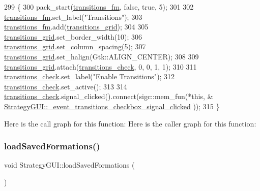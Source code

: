 \begin{DoxyCode}
299                                          \{
300     pack\_start(\hyperlink{class_strategy_g_u_i_ab3d47a7a0fb8e1f7e030c4daad0ca8ec}{transitions\_fm}, \textcolor{keyword}{false}, \textcolor{keyword}{true}, 5);
301 
302     \hyperlink{class_strategy_g_u_i_ab3d47a7a0fb8e1f7e030c4daad0ca8ec}{transitions\_fm}.set\_label(\textcolor{stringliteral}{"Transitions"});
303     \hyperlink{class_strategy_g_u_i_ab3d47a7a0fb8e1f7e030c4daad0ca8ec}{transitions\_fm}.add(\hyperlink{class_strategy_g_u_i_a1be6ca5d69ec2de3a1349ad480c9eb73}{transitions\_grid});
304     
305     \hyperlink{class_strategy_g_u_i_a1be6ca5d69ec2de3a1349ad480c9eb73}{transitions\_grid}.set\_border\_width(10);
306     \hyperlink{class_strategy_g_u_i_a1be6ca5d69ec2de3a1349ad480c9eb73}{transitions\_grid}.set\_column\_spacing(5);
307     \hyperlink{class_strategy_g_u_i_a1be6ca5d69ec2de3a1349ad480c9eb73}{transitions\_grid}.set\_halign(Gtk::ALIGN\_CENTER); 
308 
309     \hyperlink{class_strategy_g_u_i_a1be6ca5d69ec2de3a1349ad480c9eb73}{transitions\_grid}.attach(\hyperlink{class_strategy_g_u_i_ad74384d402b07845c2f9632f1382420b}{transitions\_check}, 0, 0, 1, 1);
310 
311     \hyperlink{class_strategy_g_u_i_ad74384d402b07845c2f9632f1382420b}{transitions\_check}.set\_label(\textcolor{stringliteral}{"Enable Transitions"});
312     \hyperlink{class_strategy_g_u_i_ad74384d402b07845c2f9632f1382420b}{transitions\_check}.set\_active();
313 
314     \hyperlink{class_strategy_g_u_i_ad74384d402b07845c2f9632f1382420b}{transitions\_check}.signal\_clicked().connect(sigc::mem\_fun(*\textcolor{keyword}{this}, &
      \hyperlink{class_strategy_g_u_i_a9ca1e9548a5cf277de63fe92ad92002b}{StrategyGUI::\_event\_transitions\_checkbox\_signal\_clicked}
      ));
315 \}
\end{DoxyCode}
Here is the call graph for this function\+:
Here is the caller graph for this function\+:
\mbox{\label{class_strategy_g_u_i_a616a0f321878532cf85cfd02564758b5}} 
\subsubsection{\texorpdfstring{load\+Saved\+Formations()}{loadSavedFormations()}}
{\footnotesize\ttfamily void Strategy\+G\+U\+I\+::load\+Saved\+Formations (\begin{DoxyParamCaption}{ }\end{DoxyParamCaption})\hspace{0.3cm}{\ttfamily [private]}}



